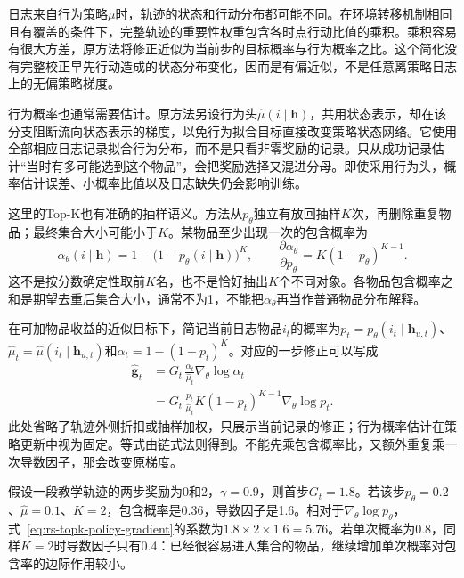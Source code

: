 日志来自行为策略$\mu$时，轨迹的状态和行动分布都可能不同。在环境转移机制相同且有覆盖的条件下，完整轨迹的重要性权重包含各时点行动比值的乘积。乘积容易有很大方差，原方法将修正近似为当前步的目标概率与行为概率之比。这个简化没有完整校正早先行动造成的状态分布变化，因而是有偏近似，不是任意离策略日志上的无偏策略梯度。

行为概率也通常需要估计。原方法另设行为头$\widehat\mu(i\mid\bm{h})$，共用状态表示，却在该分支阻断流向状态表示的梯度，以免行为拟合目标直接改变策略状态网络。它使用全部相应日志记录拟合行为分布，而不是只看非零奖励的记录。只从成功记录估计“当时有多可能选到这个物品”，会把奖励选择又混进分母。即使采用行为头，概率估计误差、小概率比值以及日志缺失仍会影响训练。

这里的Top-K也有准确的抽样语义。方法从$p_\theta$独立有放回抽样$K$次，再删除重复物品；最终集合大小可能小于$K$。某物品至少出现一次的包含概率为
\begin{equation}
 \alpha_\theta(i\mid\bm{h})
 =1-\bigl(1-p_\theta(i\mid\bm{h})\bigr)^K,
 \qquad
 \frac{\partial\alpha_\theta}{\partial p_\theta}
 =K(1-p_\theta)^{K-1}.
 \label{eq:rs-topk-inclusion}
\end{equation}
这不是按分数确定性取前$K$名，也不是恰好抽出$K$个不同对象。各物品包含概率之和是期望去重后集合大小，通常不为1，不能把$\alpha_\theta$再当作普通物品分布解释。

在可加物品收益的近似目标下，简记当前日志物品$i_t$的概率为$p_t=p_\theta(i_t\mid\bm{h}_{u,t})$、$\widehat\mu_t=\widehat\mu(i_t\mid\bm{h}_{u,t})$和$\alpha_t=1-(1-p_t)^K$。对应的一步修正可以写成
\begin{equation}
 \begin{aligned}
 \widehat{\bm{g}}_t
 &=G_t\,\frac{\alpha_t}{\widehat\mu_t}
   \nabla_\theta\log\alpha_t\\
 &=G_t\,\frac{p_t}{\widehat\mu_t}
   K(1-p_t)^{K-1}\nabla_\theta\log p_t.
 \end{aligned}
 \label{eq:rs-topk-policy-gradient}
\end{equation}
此处省略了轨迹外侧折扣或抽样加权，只展示当前记录的修正；行为概率估计在策略更新中视为固定。等式由链式法则得到。不能先乘包含概率比，又额外重复乘一次导数因子，那会改变原梯度。

假设一段教学轨迹的两步奖励为0和2，$\gamma=0.9$，则首步$G_t=1.8$。若该步$p_\theta=0.2$、$\widehat\mu=0.1$、$K=2$，包含概率是0.36，导数因子是1.6。相对于$\nabla_\theta\log p_\theta$，式~\eqref{eq:rs-topk-policy-gradient}的系数为$1.8\times2\times1.6=5.76$。若单次概率为0.8，同样$K=2$时导数因子只有0.4：已经很容易进入集合的物品，继续增加单次概率对包含率的边际作用较小。

